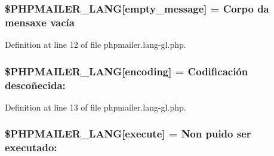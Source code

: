 \subsubsection[{\texorpdfstring{\$\+P\+H\+P\+M\+A\+I\+L\+E\+R\+\_\+\+L\+A\+NG}{$PHPMAILER_LANG}}]{\setlength{\rightskip}{0pt plus 5cm}\$P\+H\+P\+M\+A\+I\+L\+E\+R\+\_\+\+L\+A\+NG\mbox{[}\textquotesingle{}empty\+\_\+message\textquotesingle{}\mbox{]} = \textquotesingle{}Corpo da mensaxe vacía\textquotesingle{}}\hypertarget{phpmailer_8lang-gl_8php_a33772099f637c9d6c2cd7425e0e37fed}{}\label{phpmailer_8lang-gl_8php_a33772099f637c9d6c2cd7425e0e37fed}


Definition at line 12 of file phpmailer.\+lang-\/gl.\+php.

\subsubsection[{\texorpdfstring{\$\+P\+H\+P\+M\+A\+I\+L\+E\+R\+\_\+\+L\+A\+NG}{$PHPMAILER_LANG}}]{\setlength{\rightskip}{0pt plus 5cm}\$P\+H\+P\+M\+A\+I\+L\+E\+R\+\_\+\+L\+A\+NG\mbox{[}\textquotesingle{}encoding\textquotesingle{}\mbox{]} = \textquotesingle{}Codificación descoñecida\+: \textquotesingle{}}\hypertarget{phpmailer_8lang-gl_8php_a817f7283f3d54c970a0c10305cc668cc}{}\label{phpmailer_8lang-gl_8php_a817f7283f3d54c970a0c10305cc668cc}


Definition at line 13 of file phpmailer.\+lang-\/gl.\+php.

\subsubsection[{\texorpdfstring{\$\+P\+H\+P\+M\+A\+I\+L\+E\+R\+\_\+\+L\+A\+NG}{$PHPMAILER_LANG}}]{\setlength{\rightskip}{0pt plus 5cm}\$P\+H\+P\+M\+A\+I\+L\+E\+R\+\_\+\+L\+A\+NG\mbox{[}\textquotesingle{}execute\textquotesingle{}\mbox{]} = \textquotesingle{}Non puido ser executado\+: \textquotesingle{}}\hypertarget{phpmailer_8lang-gl_8php_a668217a9563a168f30f2a8548b6ed5a9}{}\label{phpmailer_8lang-gl_8php_a668217a9563a168f30f2a8548b6ed5a9}


